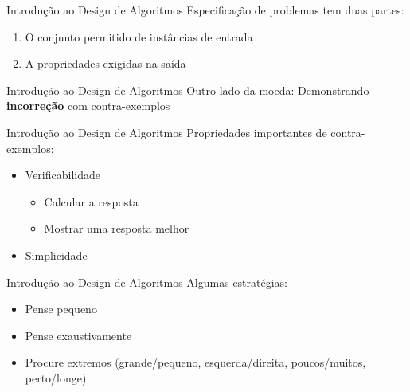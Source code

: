 \documentclass[10pt]{beamer}
\begin{document}
\begin{frame}{Introdução ao Design de Algoritmos}
    \Large
    Especificação de problemas tem duas partes:

    \begin{enumerate}
        \item \Large O conjunto permitido de instâncias de entrada
        \item \Large A propriedades exigidas na saída
    \end{enumerate}
\end{frame}

\begin{frame}{Introdução ao Design de Algoritmos}
    \huge
    Outro lado da moeda: Demonstrando \textbf{incorreção} com contra-exemplos
\end{frame}

\begin{frame}{Introdução ao Design de Algoritmos}
    \Large Propriedades importantes de contra-exemplos:

    \begin{itemize}
        \item \Large Verificabilidade
        \begin{itemize}
            \Large
            \item Calcular a resposta
            \item Mostrar uma resposta melhor
        \end{itemize}
        \item \Large Simplicidade
    \end{itemize}
\end{frame}

\begin{frame}{Introdução ao Design de Algoritmos}
    \Large Algumas estratégias:

    \begin{itemize}
        \Large
        \item Pense pequeno
        \item Pense exaustivamente
        \item Procure extremos (grande/pequeno, esquerda/direita, poucos/muitos, perto/longe)
    \end{itemize}
\end{frame}
\end{document}
